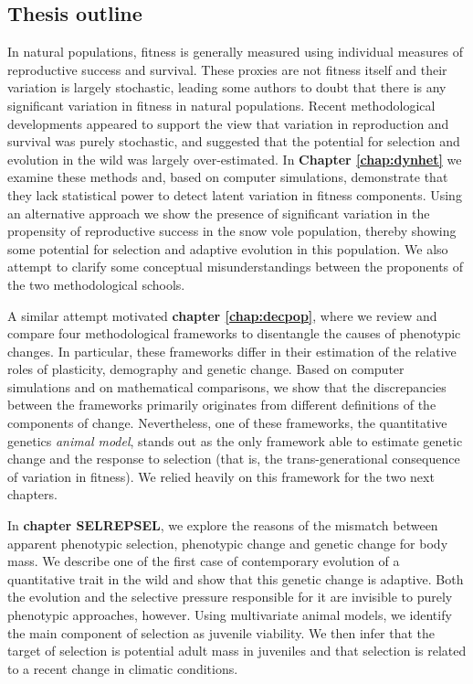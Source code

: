 \subsection{Thesis outline}

In natural populations, fitness is generally measured using individual measures of reproductive success and survival. These proxies are not fitness itself and their variation is largely stochastic, leading some authors to doubt that there is any significant variation in fitness in natural populations. Recent methodological developments appeared to support the view that variation in reproduction and survival was purely stochastic, and suggested that the potential for selection and evolution in the wild was largely over-estimated. In \textbf{Chapter \ref{chap:dynhet}} we examine these methods and, based on computer simulations, demonstrate that they lack statistical power to detect latent variation in fitness components. Using an alternative approach we show the presence of significant variation in the propensity of reproductive success in the snow vole population, thereby showing some potential for selection and adaptive evolution in this population. We also attempt to clarify some conceptual misunderstandings between the proponents of the two methodological schools. 

A similar attempt motivated \textbf{chapter \ref{chap:decpop}}, where we review and compare four methodological frameworks to disentangle the causes of phenotypic changes. In particular, these frameworks differ in their estimation of the relative roles of plasticity, demography and genetic change. Based on computer simulations and on mathematical comparisons, we show that the discrepancies between the frameworks primarily originates from different definitions of the components of change. Nevertheless, one of these frameworks, the quantitative genetics \emph{animal model}, stands out as the only framework able to estimate genetic change and the response to selection (that is, the trans-generational consequence of variation in fitness). We relied heavily on this framework for the two next chapters.  

In \textbf{chapter SELREPSEL}, we explore the reasons of the mismatch between apparent phenotypic selection, phenotypic change and genetic change for body mass. We describe one of the first case of contemporary evolution of a quantitative trait in the wild and show that this genetic change is adaptive. Both the evolution and the selective pressure responsible for it are invisible to purely phenotypic approaches, however. Using multivariate animal models, we identify the main component of selection as juvenile viability. We then infer that the target of selection is potential adult mass in juveniles and that selection is related to a recent change in climatic conditions. 


